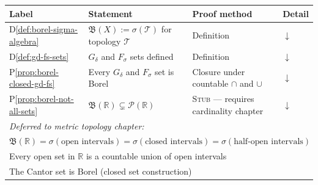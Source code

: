 %
%

\begin{tcolorbox}[colback=gray!6, colframe=gray!40, arc=2pt,
  left=6pt, right=6pt, top=4pt, bottom=4pt,
  title={\small\textbf{Section Toolkit --- Quick Reference}},
  fonttitle=\small\bfseries]
\small
\begin{tabular}{l l l l}
\toprule
\textbf{Label} & \textbf{Statement} & \textbf{Proof method} & \textbf{Detail} \\
\midrule
D\ref{def:borel-sigma-algebra}
  & $\mathfrak{B}(X) := \sigma(\mathcal{T})$ for topology $\mathcal{T}$
  & Definition & \hyperref[def:borel-sigma-algebra]{$\downarrow$} \\
D\ref{def:gd-fs-sets}
  & $G_\delta$ and $F_\sigma$ sets defined
  & Definition & \hyperref[def:gd-fs-sets]{$\downarrow$} \\
P\ref{prop:borel-closed-gd-fs}
  & Every $G_\delta$ and $F_\sigma$ set is Borel
  & Closure under countable $\cap$ and $\cup$
  & \hyperref[prf:borel-closed-gd-fs]{$\downarrow$} \\
P\ref{prop:borel-not-all-sets}
  & $\mathfrak{B}(\mathbb{R}) \subsetneq \mathcal{P}(\mathbb{R})$
  & \textsc{Stub} --- requires cardinality chapter
  & \hyperref[prf:borel-not-all-sets]{$\downarrow$} \\
\midrule
\multicolumn{4}{l}{\textit{Deferred to metric topology chapter:}} \\
\multicolumn{4}{l}{%
  $\mathfrak{B}(\mathbb{R}) = \sigma(\text{open intervals})
  = \sigma(\text{closed intervals}) = \sigma(\text{half-open intervals})$} \\
\multicolumn{4}{l}{%
  Every open set in $\mathbb{R}$ is a countable union of open intervals} \\
\multicolumn{4}{l}{%
  The Cantor set is Borel (closed set construction)} \\
\bottomrule
\end{tabular}
\end{tcolorbox}

